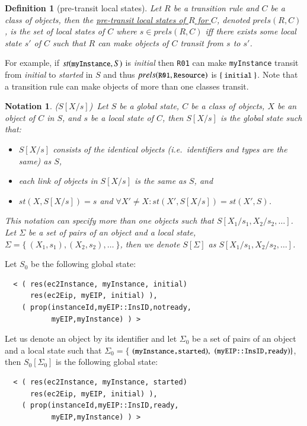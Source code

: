 \documentclass[12pt]{report}
\newtheorem{notation}{Notation}
\newtheorem{definition}{Definition}
\newcommand{\mbstt}[1]{\mbox{\small{\tt {#1}}}}
\newcommand{\stt}[1]{{\small{\tt {#1}}}}
\newcommand{\ul}{\underline}
\begin{document}
\begin{definition}[pre-transit local states]
Let $R$ be a transition rule and $C$ be a class of objects, then
the \ul{pre-transit local states of $R$ for $C$}, denoted
\ul{$prels(R,C)$}, is the set of local states of $C$ where $s \in
prels(R,C)$ iff there exists some local state $s'$ of $C$ such that
$R$ can make objects of $C$ transit from $s$ to $s'$.
\end{definition}
For example, if $st(\mbstt{myInstance},S)$ is {\it initial} then
\stt{R01} can make \stt{myInstance} transit from {\it initial} to {\it
  started} in $S$ and thus $prels(\mbstt{R01},\mbstt{Resource})$ is
$\{~\mbstt{initial}~\}$. Note that a transition rule can make objects
of more than one classes transit.

\begin{notation}($S[X/s]$)\
Let $S$ be a global state, $C$ be a class of objects, $X$ be an object
of $C$ in $S$, and $s$ be a local state of $C$, then
\ul{$S[X/s]$} is the global state such that:
\begin{itemize}
\item $S[X/s]$ consists of the identical objects (i.e.\ identifiers and
  types are the same) as $S$,
\item each link of objects in $S[X/s]$ is the same as $S$, and
\item $st(X,S[X/s])=s$ and $\forall X'\ne X:st(X',S[X/s])=st(X',S)$.
\end{itemize}
This notation can specify more than one objects such that
\ul{$S[X_1/s_1,X_2/s_2,\dots]$}.  Let $\Sigma$ be a set of pairs of
an object and a local state, $\Sigma = \{~ (X_1,s_1), (X_2,s_2), \dots~\}$,
then we denote \ul{$S[\Sigma]$} as $S[X_1/s_1,X_2/s_2,\dots]$.
\end{notation}
Let $S_0$ be the following global state:
\begin{verbatim}
  < ( res(ec2Instance, myInstance, initial)
      res(ec2Eip, myEIP, initial) ),
    ( prop(instanceId,myEIP::InsID,notready,
           myEIP,myInstance) ) >
\end{verbatim}
Let us denote an object by its identifier and let $\Sigma_0$ be a set
of pairs of an object and a local state such that $\Sigma_0=\{$
$(\mbstt{myInstance,started}),$ $(\mbstt{myEIP::InsID,ready})\}$, then
$S_0[\Sigma_0]$ is the following global state:
\begin{verbatim}
  < ( res(ec2Instance, myInstance, started)
      res(ec2Eip, myEIP, initial) ),
    ( prop(instanceId,myEIP::InsID,ready,
           myEIP,myInstance) ) >
\end{verbatim}
\end{document}
